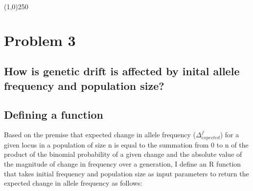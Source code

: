\documentclass[]{article}
\begin{document}



\begin{center}
\line(1,0){250}
\end{center}

\pagebreak

\section{Problem 3}\label{problem-3}

\subsection{How is genetic drift is affected by inital allele frequency
and population
size?}\label{how-is-genetic-drift-is-affected-by-inital-allele-frequency-and-population-size}

\subsection{Defining a function}\label{defining-a-function}

Based on the premise that expected change in allele frequency
($\Delta_{expected}^f$) for a given locus in a population of size n is
equal to the summation from 0 to n of the product of the binomial
probability of a given change and the absolute value of the magnitude of
change in frequency over a generation, I define an R function that takes
initial frequency and population size as input parameters to return the
expected change in allele frequency as follows:
\end{document}
